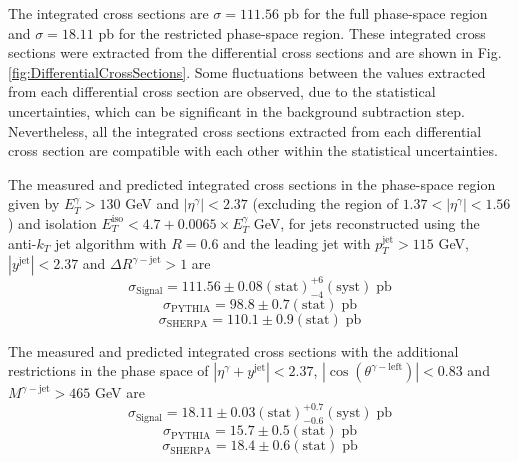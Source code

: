 \documentclass[12pt, twoside]{article}
\numberwithin{equation}{section}
\numberwithin{figure}{section}
\begin{document}
The integrated cross sections are $\sigma = 111.56$ pb for the full phase-space region and $\sigma = 18.11$ pb for the restricted phase-space region. These integrated cross sections were extracted from the differential cross sections and are shown in Fig.\,\ref{fig:DifferentialCrossSections}. Some fluctuations between the values extracted from each differential cross section are observed, due to the statistical uncertainties, which can be significant in the background subtraction step. Nevertheless, all the integrated cross sections extracted from each differential cross section are compatible with each other within the statistical uncertainties.

The measured and predicted integrated cross sections in the phase-space region given by $E^{\gamma}_{T} > 130$ GeV and $\left| \eta^{\gamma} \right| < 2.37$ (excluding the region of $1.37 < \left| \eta^{\gamma} \right| < 1.56$) and isolation $E^{\text{iso}}_{T} < 4.7 + 0.0065 \times E^{\gamma}_{T}$ GeV, for jets reconstructed using the anti-$k_{T}$ jet algorithm with $R = 0.6$ and the leading jet with $p^{\text{jet}}_{T} > 115$ GeV, $\left| y^{\text{jet}} \right| < 2.37$ and $\Delta R^{\gamma-\text{jet}} > 1$ are
\begin{equation}    \label{results:DiffCrossSectHighSignal}
    \sigma_{\text{Signal}} = 111.56 \pm \text{0.08} (\text{stat}) ^{+ \text{6}} _{- \text{4}} (\text{syst}) \; \text{pb}
\end{equation}
\begin{equation}    \label{results:DiffCrossSectHighPythia}
    \sigma_{\text{PYTHIA}} = 98.8 \pm \text{0.7} (\text{stat}) \; \text{pb}
\end{equation}
\begin{equation}    \label{results:DiffCrossSectHighSherpa}
    \sigma_{\text{SHERPA}} = 110.1 \pm \text{0.9} (\text{stat}) \; \text{pb}
\end{equation}

The measured and predicted integrated cross sections with the additional restrictions in the phase space of $\left| \eta^{\gamma} + y^{\text{jet}} \right| < 2.37$, $\left| \cos \left( \theta^{\gamma-\text{left}} \right) \right| < 0.83$ and $M^{\gamma-\text{jet}} > 465$ GeV are
\begin{equation}    \label{results:DiffCrossSectLow}
    \sigma_{\text{Signal}} = 18.11 \pm \text{0.03} (\text{stat}) ^{+ \text{0.7}} _{- \text{0.6}} (\text{syst}) \; \text{pb}
\end{equation}
\begin{equation}    \label{results:DiffCrossSectLowPythia}
    \sigma_{\text{PYTHIA}} = 15.7 \pm \text{0.5} (\text{stat}) \; \text{pb}
\end{equation}
\begin{equation}    \label{results:DiffCrossSectLowSherpa}
    \sigma_{\text{SHERPA}} = 18.4 \pm \text{0.6} (\text{stat}) \; \text{pb}
\end{equation}
\end{document}
